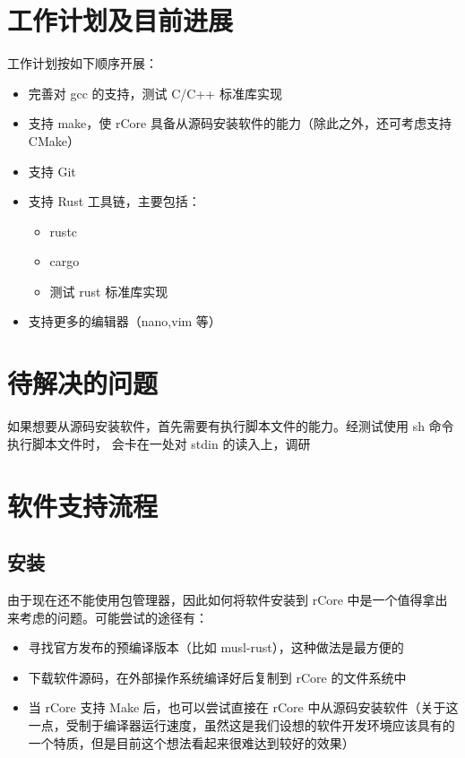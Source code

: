 \documentclass{article}
\begin{document}
    \section{工作计划及目前进展}

    工作计划按如下顺序开展：

    \begin{itemize}
        \item 完善对 gcc 的支持，测试 C/C++ 标准库实现
        \item 支持 make，使 rCore 具备从源码安装软件的能力（除此之外，还可考虑支持 CMake）
        \item 支持 Git
        \item 支持 Rust 工具链，主要包括：
        \begin{itemize}
            \item rustc
            \item cargo
            \item 测试 rust 标准库实现
        \end{itemize}
        \item 支持更多的编辑器（nano,vim 等）
    \end{itemize}

    \section{待解决的问题}

    如果想要从源码安装软件，首先需要有执行脚本文件的能力。经测试使用 sh 命令执行脚本文件时，
    会卡在一处对 stdin 的读入上，调研


    \section{软件支持流程}
    \subsection{安装}

    由于现在还不能使用包管理器，因此如何将软件安装到 rCore 中是一个值得拿出来考虑的问题。可能尝试的途径有：
    \begin{itemize}
        \item 寻找官方发布的预编译版本（比如 musl-rust），这种做法是最方便的
        \item 下载软件源码，在外部操作系统编译好后复制到 rCore 的文件系统中
        \item 当 rCore 支持 Make 后，也可以尝试直接在 rCore 中从源码安装软件（关于这一点，受制于编译器运行速度，虽然这是我们设想的软件开发环境应该具有的一个特质，但是目前这个想法看起来很难达到较好的效果）        
    \end{itemize}
\end{document}

